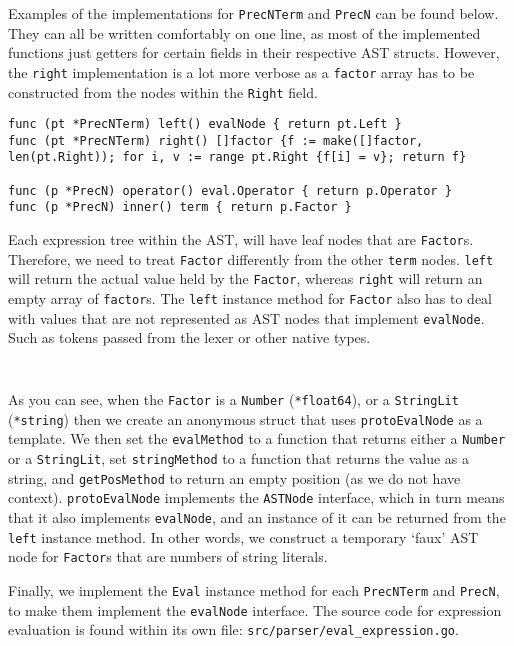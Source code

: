 \inputminted[firstline=51, lastline=92, autogobble, breaklines, tabsize=4]{go}{../../src/parser/eval_expression.go}

Examples of the implementations for \verb|PrecNTerm| and \verb|PrecN| can be found below. They can all be written comfortably on one line, as most of the implemented functions just getters for certain fields in their respective AST structs. However, the \verb|right| implementation is a lot more verbose as a \verb|factor| array has to be constructed from the nodes within the \verb|Right| field.

\begin{verbatim}    
func (pt *PrecNTerm) left() evalNode { return pt.Left }
func (pt *PrecNTerm) right() []factor {f := make([]factor, len(pt.Right)); for i, v := range pt.Right {f[i] = v}; return f}

func (p *PrecN) operator() eval.Operator { return p.Operator }
func (p *PrecN) inner() term { return p.Factor }
\end{verbatim}

Each expression tree within the AST, will have leaf nodes that are \verb|Factor|s. Therefore, we need to treat \verb|Factor| differently from the other \verb|term| nodes. \verb|left| will return the actual value held by the \verb|Factor|, whereas \verb|right| will return an empty array of \verb|factor|s. The \verb|left| instance method for \verb|Factor| also has to deal with values that are not represented as AST nodes that implement \verb|evalNode|. Such as tokens passed from the lexer or other native types.

\inputminted[firstline=32, lastline=49, autogobble, breaklines, tabsize=4]{go}{../../src/parser/eval_expression.go}

\inputminted[firstline=130, lastline=179, autogobble, breaklines, tabsize=4]{go}{../../src/parser/eval_expression.go}

As you can see, when the \verb|Factor| is a \verb|Number| (\texttt{*float64}), or a \verb|StringLit| (\texttt{*string}) then we create an anonymous struct that uses \verb|protoEvalNode| as a template. We then set the \verb|evalMethod| to a function that returns either a \verb|Number| or a \verb|StringLit|, set \verb|stringMethod| to a function that returns the value as a string, and \verb|getPosMethod| to return an empty position (as we do not have context). \verb|protoEvalNode| implements the \verb|ASTNode| interface, which in turn means that it also implements \verb|evalNode|, and an instance of it can be returned from the \verb|left| instance method. In other words, we construct a temporary `faux' AST node for \verb|Factor|s that are numbers of string literals.

Finally, we implement the \verb|Eval| instance method for each \verb|PrecNTerm| and \verb|PrecN|, to make them implement the \verb|evalNode| interface. The source code for expression evaluation is found within its own file: \verb|src/parser/eval_expression.go|.

\inputminted[firstline=182, lastline=194, fontsize=\footnotesize, autogobble, breaklines, tabsize=4]{go}{../../src/parser/eval_expression.go}

